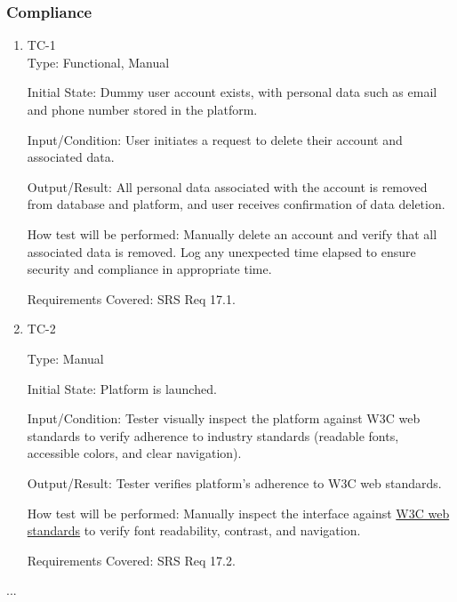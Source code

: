 \documentclass[12pt, titlepage]{article}
\begin{document}
\subsubsection{Compliance}
\begin{enumerate}
\item{TC-1\\}
Type: Functional, Manual
					
Initial State: Dummy user account exists, with personal data such as email and phone number stored in the platform.
					
Input/Condition: User initiates a request to delete their account and associated data.
					
Output/Result: All personal data associated with the account is removed from database and platform, and user receives confirmation of data deletion.
					
How test will be performed: Manually delete an account and verify that all associated data is removed. Log any unexpected time elapsed to ensure security and compliance in appropriate time.

Requirements Covered: SRS Req 17.1.

\item{TC-2\\}

Type: Manual
					
Initial State: Platform is launched.
					
Input/Condition: Tester visually inspect the platform against W3C web standards to verify adherence to industry standards (readable fonts, accessible colors, and clear navigation).
					
Output/Result: Tester verifies platform's adherence to W3C web standards.
					
How test will be performed: Manually inspect the interface against \href{https://www.w3.org/standards/}{W3C web standards} to verify font readability, contrast, and navigation.

Requirements Covered: SRS Req 17.2.
\end{enumerate}

...
\end{document}
